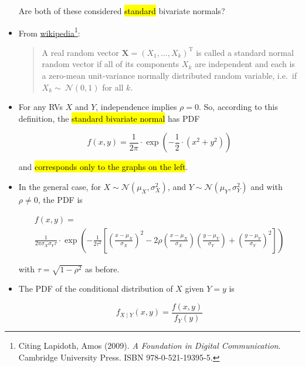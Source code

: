 \documentclass[
  11pt]{report}
\begin{document}
\begin{itemize}
  \begin{rmdbox}
  Are both of these considered {\hl{standard}} bivariate normals?

  \end{rmdbox}
\item
  From \href{https://en.wikipedia.org/wiki/Multivariate_normal_distribution\#Standard_normal_random_vector}{wikipedia}\footnote{Citing Lapidoth, Amos (2009). \emph{A Foundation in Digital Communication}. Cambridge University Press. ISBN 978-0-521-19395-5.}:

  \begin{quote}
  A real random vector ${\displaystyle \mathbf {X} =(X_{1},\ldots ,X_{k})^{\mathrm {T} }}$ is called a standard normal random vector if all of its components ${\displaystyle X_{k}}$ are independent and each is a zero-mean unit-variance normally distributed random variable, i.e.~if ${\displaystyle X_{k}\sim \ {\mathcal {N}}(0,1)}$ for all ${\displaystyle k}$.
  \end{quote}
\item
  For any RVs $X$ and $Y$, independence implies $\rho = 0$. So, according to this definition, the {\hl{standard bivariate normal}} has PDF

  \[
  f(x, y) = \frac{1}{2\pi} \cdot 
  \exp\left(
    -\frac{1}{2} \cdot (x^2 + y^2)
  \right)
  \]

  and {\hl{corresponds only to the graphs on the left}}.
\item
  In the general case, for $X \sim \mathcal N\left(\mu_X, \sigma^2_X\right)$, and $Y \sim \mathcal N\left(\mu_Y, \sigma^2_Y\right)$ and with $\rho \neq 0$, the PDF is

  \begin{multline}
  f(x,y) = \\ 
  {
    \frac {1}
    {
      2\pi \sigma _{X}\sigma _{Y}\tau
    }
  }\cdot \exp \left(
    -{
      \frac {1}{2\tau^2}
    }\left[
      \left(
        {\frac {x-\mu _{X}}{\sigma_{X}}}
      \right)^{2} -
      2\rho \left(
        {\frac {x-\mu _{X}}{\sigma_{X}}}
      \right)
      \left(
        {\frac {y-\mu _{Y}}{\sigma_{Y}}}
      \right) +
      \left(
        {\frac {y-\mu _{Y}}{\sigma_{Y}}}
      \right)^{2}
    \right]
  \right)
  \end{multline}

  with $\tau = \sqrt{1 - \rho^2}$ as before.
\item
  The PDF of the conditional distribution of $X$ given $Y = y$ is

  \[
  f_{X \mid Y} (x, y) = 
  \frac{f(x, y)}{f_Y(y)}
  \]


\end{itemize}
\end{document}
